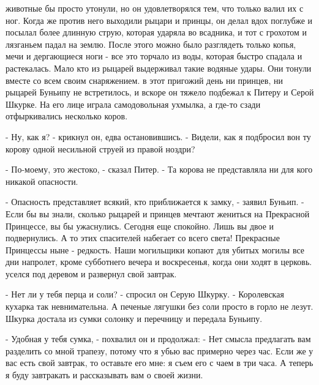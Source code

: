 животные бы просто утонули, но он удовлетворялся тем, что только валил 
их с ног. Когда же против него выходили рыцари и принцы, он делал вдох 
поглубже и посылал более длинную струю, которая ударяла во всадника, и 
тот с грохотом и лязганьем падал на землю. После этого можно было 
разглядеть только копья, мечи и дергающиеся ноги - все это торчало из 
воды, которая быстро спадала и растекалась. Мало кто из рыцарей 
выдерживал такие водяные удары. Они тонули вместе со всем своим 
снаряжением.
 в этот пригожий день ни принцев, ни рыцарей Буньипу не 
встретилось, и вскоре он тяжело подбежал к Питеру и Серой Шкурке. На 
его лице играла самодовольная ухмылка, а где-то сзади отфыркивались 
несколько коров.
\par- Ну, как я? - крикнул он, едва остановившись. - Видели, как я 
подбросил вон ту корову одной несильной струей из правой ноздри?
\par- По-моему, это жестоко, - сказал Питер. - Та корова не 
представляла ни для кого никакой опасности.
\par- Опасность представляет всякий, кто приближается к замку, - 
заявил Буньип. - Если бы вы знали, сколько рыцарей и принцев мечтают 
жениться на Прекрасной Принцессе, вы бы ужаснулись. Сегодня еще 
спокойно. Лишь вы двое и подвернулись. А то этих спасителей набегает 
со всего света! Прекрасные Принцессы ныне - редкость. Наши могильщики 
копают для убитых могилы все дни напролет, кроме субботнего вечера и 
воскресенья, когда они ходят в церковь.
 уселся под деревом и развернул свой завтрак.
\par- Нет ли у тебя перца и соли? - спросил он Серую Шкурку. - 
Королевская кухарка так невнимательна. А печеные лягушки без соли 
просто в горло не лезут.
 Шкурка достала из сумки солонку и перечницу и передала 
Буньипу.
\par- Удобная у тебя сумка, - похвалил он и продолжал: - Нет смысла 
предлагать вам разделить со мной трапезу, потому что я убью вас 
примерно через час. Если же у вас есть свой завтрак, то оставьте его 
мне: я съем его с чаем в три часа. А теперь я буду завтракать и 
рассказывать вам о своей жизни.
